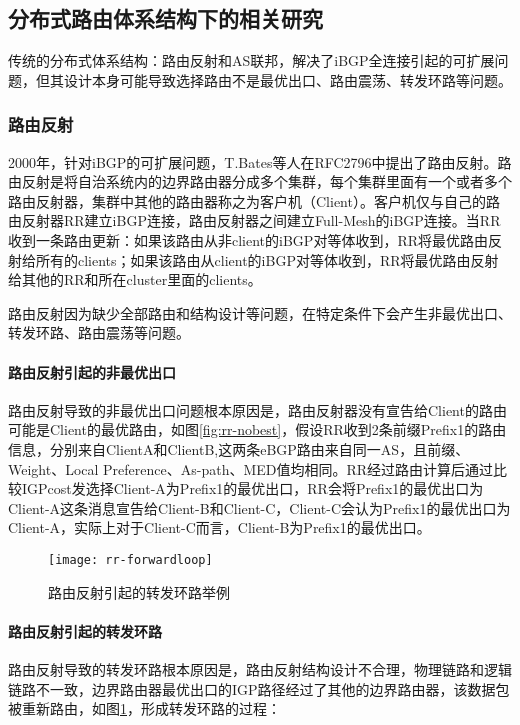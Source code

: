 \subsection{分布式路由体系结构下的相关研究}
传统的分布式体系结构：路由反射和AS联邦，解决了iBGP全连接引起的可扩展问题，但其设计本身可能导致选择路由不是最优出口、路由震荡、转发环路等问题。

\subsubsection{路由反射\cite{rfc2796}}
\label{subsubsec:rr}
2000年，针对iBGP的可扩展问题，T.Bates等人在RFC2796\cite{rfc2796}中提出了路由反射。路由反射是将自治系统内的边界路由器分成多个集群，每个集群里面有一个或者多个路由反射器，集群中其他的路由器称之为客户机（Client）。客户机仅与自己的路由反射器RR建立iBGP连接，路由反射器之间建立Full-Mesh的iBGP连接。当RR收到一条路由更新：如果该路由从非client的iBGP对等体收到，RR将最优路由反射给所有的clients；如果该路由从client的iBGP对等体收到，RR将最优路由反射给其他的RR和所在cluster里面的clients。



路由反射因为缺少全部路由和结构设计等问题，在特定条件下会产生非最优出口、转发环路、路由震荡等问题。


\paragraph{路由反射引起的非最优出口}
路由反射导致的非最优出口问题根本原因是，路由反射器没有宣告给Client的路由可能是Client的最优路由，如图\ref{fig:rr-nobest}，假设RR收到2条前缀Prefix1的路由信息，分别来自ClientA和ClientB,这两条eBGP路由来自同一AS，且前缀、Weight、Local Preference、As-path、MED值均相同。RR经过路由计算后通过比较IGPcost发选择Client-A为Prefix1的最优出口，RR会将Prefix1的最优出口为Client-A这条消息宣告给Client-B和Client-C，Client-C会认为Prefix1的最优出口为Client-A，实际上对于Client-C而言，Client-B为Prefix1的最优出口。

\begin{figure}
  \centering
  \texttt{[image: rr-forwardloop]}
  \caption{路由反射引起的转发环路举例\cite{Dube1999A}}
  \label{fig:rr-forwardloop}
\end{figure}


\paragraph{路由反射引起的转发环路}
路由反射导致的转发环路\cite{Dube1999A}根本原因是，路由反射结构设计不合理，物理链路和逻辑链路不一致，边界路由器最优出口的IGP路径经过了其他的边界路由器，该数据包被重新路由，如图\ref{fig:rr-forwardloop}，形成转发环路的过程：

